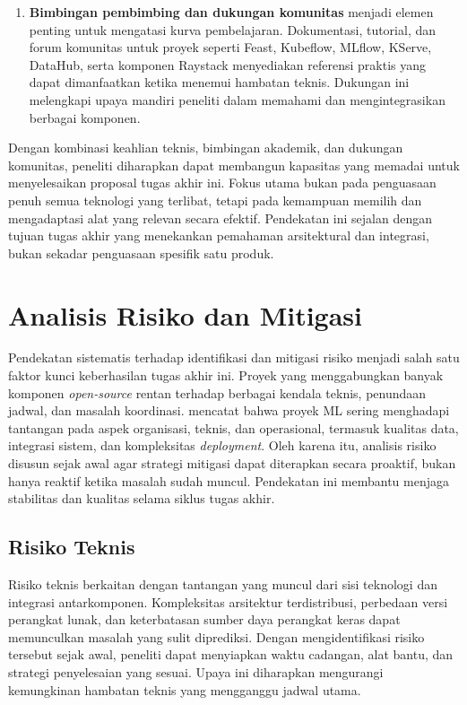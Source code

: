 \begin{enumerate}
    \vspace{0.5em}
    
    \item \textbf{Bimbingan pembimbing dan dukungan komunitas} menjadi elemen penting untuk mengatasi kurva pembelajaran. Dokumentasi, tutorial, dan forum komunitas untuk proyek seperti Feast, Kubeflow, MLflow, KServe, DataHub, serta komponen Raystack menyediakan referensi praktis yang dapat dimanfaatkan ketika menemui hambatan teknis. Dukungan ini melengkapi upaya mandiri peneliti dalam memahami dan mengintegrasikan berbagai komponen.
    
    \vspace{0.5em}
\end{enumerate}

Dengan kombinasi keahlian teknis, bimbingan akademik, dan dukungan komunitas, peneliti diharapkan dapat membangun kapasitas yang memadai untuk menyelesaikan proposal tugas akhir ini. Fokus utama bukan pada penguasaan penuh semua teknologi yang terlibat, tetapi pada kemampuan memilih dan mengadaptasi alat yang relevan secara efektif. Pendekatan ini sejalan dengan tujuan tugas akhir yang menekankan pemahaman arsitektural dan integrasi, bukan sekadar penguasaan spesifik satu produk.

\section{Analisis Risiko dan Mitigasi}

Pendekatan sistematis terhadap identifikasi dan mitigasi risiko menjadi salah satu faktor kunci keberhasilan tugas akhir ini. Proyek yang menggabungkan banyak komponen \textit{open-source} rentan terhadap berbagai kendala teknis, penundaan jadwal, dan masalah koordinasi. \textcite{paleyes2022challenges} mencatat bahwa proyek ML sering menghadapi tantangan pada aspek organisasi, teknis, dan operasional, termasuk kualitas data, integrasi sistem, dan kompleksitas \textit{deployment}. Oleh karena itu, analisis risiko disusun sejak awal agar strategi mitigasi dapat diterapkan secara proaktif, bukan hanya reaktif ketika masalah sudah muncul. Pendekatan ini membantu menjaga stabilitas dan kualitas selama siklus tugas akhir.

\subsection{Risiko Teknis}

Risiko teknis berkaitan dengan tantangan yang muncul dari sisi teknologi dan integrasi antarkomponen. Kompleksitas arsitektur terdistribusi, perbedaan versi perangkat lunak, dan keterbatasan sumber daya perangkat keras dapat memunculkan masalah yang sulit diprediksi. Dengan mengidentifikasi risiko tersebut sejak awal, peneliti dapat menyiapkan waktu cadangan, alat bantu, dan strategi penyelesaian yang sesuai. Upaya ini diharapkan mengurangi kemungkinan hambatan teknis yang mengganggu jadwal utama.

